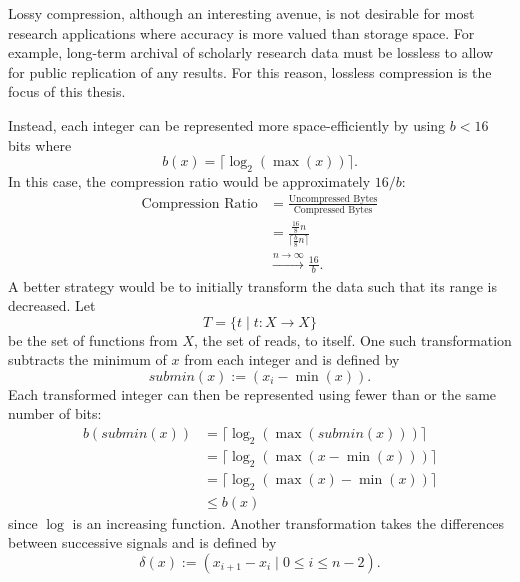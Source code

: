 Lossy compression, although an interesting avenue, is not desirable for most research applications where accuracy is more valued than storage space. For example, long-term archival of scholarly research data must be lossless to allow for public replication of any results. For this reason, lossless compression is the focus of this thesis.


Instead, each integer can be represented more space-efficiently by using $b<16$ bits where \[b(x)=\lceil\log_2(\max(x))\rceil.\] In this case, the compression ratio would be approximately $16/b$:
\begin{align*}
	\text{Compression Ratio} &= \frac{\text{Uncompressed Bytes}}{\text{Compressed Bytes}}\\
	&=\frac{\frac{16}{8}n}{\lceil\frac{b}{8}n\rceil}\\
	&\stackrel{n\to\infty}{\longrightarrow}\frac{16}{b}.
\end{align*}
A better strategy would be to initially transform the data such that its range is decreased.
Let \[T=\{t\mid t:X\to X\}\] be the set of functions from $X$, the set of reads, to itself. One such transformation subtracts the minimum of $x$ from each integer and is defined by \[ submin(x) := (x_i-\min(x)). \] Each transformed integer can then be represented using fewer than or the same number of bits:
\begin{align*}
	b(submin(x))&=\lceil\log_2(\max(submin(x)))\rceil\\
	&=\lceil\log_2(\max(x-\min(x)))\rceil\\
	&=\lceil\log_2(\max(x)-\min(x))\rceil\\
	&\le b(x)
\end{align*}
since $\log$ is an increasing function.
Another transformation takes the differences between successive signals and is defined by
\[ \delta(x):=(x_{i+1}-x_i\mid 0\le i\le n-2).\]

